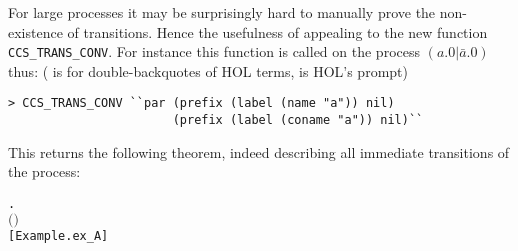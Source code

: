 For large processes it may be surprisingly hard to manually prove the
non-existence of transitions.  Hence the usefulness of appealing to 
the new  function \texttt{CCS\_TRANS\_CONV}. 
For instance this function
is called on the  process $(a.0 | \bar{a}.0)$ thus:
(\mbox{} is for double-backquotes of HOL
  terms, \mbox{\color{blue}{\texttt{>}}} is HOL's prompt)
\begin{lstlisting}
> CCS_TRANS_CONV ``par (prefix (label (name "a")) nil)
                       (prefix (label (coname "a")) nil)``
\end{lstlisting}
This returns the following theorem, indeed describing all immediate
transitions of the process:
\begin{alltt}
\HOLTokenTurnstile{} \HOLSymConst{\HOLTokenForall{}} .
        \HOLSymConst{\ensuremath{\ldotp}} \HOLSymConst{\ensuremath{\mid}}  \HOLSymConst{\ensuremath{\ldotp}} \HOLTokenTransBegin{}\HOLTokenTransEnd {} \HOLSymConst{\HOLTokenEquiv{}}
       \ensuremath{(} \HOLSymConst{\ensuremath{=}}   \HOLSymConst{\HOLTokenConj{}}  \HOLSymConst{\ensuremath{=}}  \HOLSymConst{\ensuremath{\mid}}  \HOLSymConst{\ensuremath{\ldotp}} \HOLSymConst{\HOLTokenDisj{}}  \HOLSymConst{\ensuremath{=}}   \HOLSymConst{\HOLTokenConj{}}  \HOLSymConst{\ensuremath{=}}  \HOLSymConst{\ensuremath{\ldotp}} \HOLSymConst{\ensuremath{\mid}} \ensuremath{)} \HOLSymConst{\HOLTokenDisj{}}
        \HOLSymConst{\ensuremath{=}} \HOLSymConst{\ensuremath{\tau}} \HOLSymConst{\HOLTokenConj{}}  \HOLSymConst{\ensuremath{=}}  \HOLSymConst{\ensuremath{\mid}} \hfill{[Example.ex_A]}
\end{alltt}

